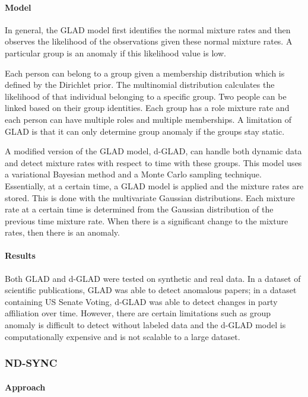 \documentclass[11pt, oneside]{article}   	%
\begin{document}
\paragraph{Model}
\quad

\quad In general, the GLAD model first identifies the normal mixture rates and then observes the likelihood of the observations given these normal mixture rates.
A particular group is an anomaly if this likelihood value is low.

\quad Each person can belong to a group given a membership distribution which is defined by the Dirichlet prior.
The multinomial distribution calculates the likelihood of that individual belonging to a specific group.
Two people can be linked based on their group identities.
Each group has a role mixture rate and each person can have multiple roles and multiple memberships.
A limitation of GLAD is that it can only determine group anomaly if the groups stay static.

\quad A modified version of the GLAD model, d-GLAD, can handle both dynamic data and detect mixture rates with respect to time with these groups.
This model uses a variational Bayesian method and a Monte Carlo sampling technique.
Essentially, at a certain time, a GLAD model is applied and the mixture rates are stored.
This is done with the multivariate Gaussian distributions.
Each mixture rate at a certain time is determined from the Gaussian distribution of the previous time mixture rate.
When there is a significant change to the mixture rates, then there is an anomaly.

\paragraph{Results}
\quad

\quad Both GLAD and d-GLAD were tested on synthetic and real data.
In a dataset of scientific publications, GLAD was able to detect anomalous papers; in a dataset containing US Senate Voting, d-GLAD was able to detect changes in party affiliation over time.
However, there are certain limitations such as group anomaly is difficult to detect without labeled data and the d-GLAD model is computationally expensive and is not scalable to a large dataset.

\subsubsection{ND-SYNC}

\paragraph{Approach}
\quad
\end{document}
